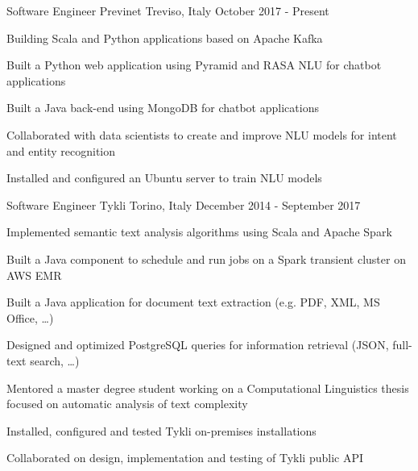 

\begin{cventries}

  \cventry
    {Software Engineer} %
    {Previnet} %
    {Treviso, Italy} %
    {October 2017 - Present} %
    {
      \begin{cvitems} %
        \item {Building Scala and Python applications based on Apache Kafka}
        \item {Built a Python web application using Pyramid and RASA NLU for chatbot applications}
        \item {Built a Java back-end using MongoDB for chatbot applications}
        \item {Collaborated with data scientists to create and improve NLU models for intent and entity recognition}
        \item {Installed and configured an Ubuntu server to train NLU models}
      \end{cvitems}
    }

  \cventry
    {Software Engineer} %
    {Tykli} %
    {Torino, Italy} %
    {December 2014 - September 2017} %
    {
      \begin{cvitems} %
        \item {Implemented semantic text analysis algorithms using Scala and Apache Spark}
        \item {Built a Java component to schedule and run jobs on a Spark transient cluster on AWS EMR}
        \item {Built a Java application for document text extraction (e.g. PDF, XML, MS Office, \ldots)}
        \item {Designed and optimized PostgreSQL queries for information retrieval (JSON, full-text search, \ldots)}
        \item {Mentored a master degree student working on a Computational Linguistics thesis focused on automatic analysis of text complexity}
        \item {Installed, configured and tested Tykli on-premises installations}
        \item {Collaborated on design, implementation and testing of Tykli public API}
      \end{cvitems}
    }


\end{cventries}
